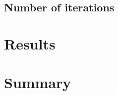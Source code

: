 \documentclass[thesis.tex]{subfiles}
\begin{document}
\subsection{Number of iterations}





\section{Results} \label{sec:C4-results}






\section{Summary} \label{sec:C4-summary}
\end{document}
